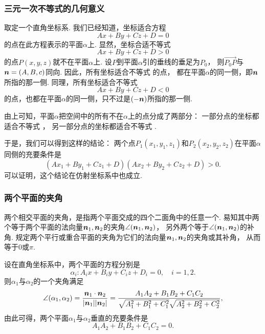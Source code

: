 \subsubsection{三元一次不等式的几何意义}
取定一个直角坐标系.
我们已经知道，坐标适合方程\[
	A x + B y + C z + D = 0
\]的点在此方程表示的平面\(\alpha\)上.
显然，坐标合适不等式
\begin{equation}\label{equation:解析几何.平面的侧1}
	A x + B y + C z + D > 0
\end{equation}
的点\(P(x,y,z)\)就不在平面\(\alpha\)上.
设\(P\)到平面\(\alpha\)引的垂线的垂足为\(P_0\)，
则\(\vec{P_0 P}\)与\(\boldsymbol{n}=(A,B,c)\)同向.
因此，所有坐标适合不等式  的点，
都在平面\(\alpha\)的同一侧，即\(\boldsymbol{n}\)所指的那一侧.
同理，所有坐标适合不等式
\begin{equation}\label{equation:解析几何.平面的侧2}
	A x + B y + C z + D < 0
\end{equation}
的点，也都在平面\(\alpha\)的同一侧，只不过是\((-\boldsymbol{n})\)所指的那一侧.

由上可知，平面\(\alpha\)把空间中的所有不在\(\alpha\)上的点分成了两部分：
一部分点的坐标都适合不等式 ，
另一部分点的坐标都适合不等式 .

于是，我们可以得到这样的结论：
两个点\(P_1(x_1,y_1,z_1)\)和\(P_2(x_2,y_2,z_2)\)在平面\(\alpha\)同侧的充要条件是\[
	(A x_1 + B y_1 + C z_1 + D) (A x_2 + B y_2 + C z_2 + D) > 0.
\]
可以证明，这个结论在仿射坐标系中也成立.

\subsubsection{两个平面的夹角}
两个相交平面的夹角，是指两个平面交成的四个二面角中的任意一个.
易知其中两个等于两个平面的法向量\(\boldsymbol{n}_1,\boldsymbol{n}_2\)的夹角\(\angle(\boldsymbol{n}_1,\boldsymbol{n}_2)\)，
另外两个等于\(\angle(\boldsymbol{n}_1,\boldsymbol{n}_2)\)的补角.
规定两个平行或重合平面的夹角为它们的法向量\(\boldsymbol{n}_1,\boldsymbol{n}_2\)的夹角或其补角，
从而等于\(0\)或\(\pi\).

设在直角坐标系中，两个平面的方程分别是\[
	\alpha_i:
	A_i x + B_i y + C_i z + D_i = 0,
	\quad i=1,2.
\]
则\(\alpha_1\)与\(\alpha_2\)的一个夹角满足\[
	\angle(\alpha_1,\alpha_2)
	= \frac{\boldsymbol{n}_1 \cdot \boldsymbol{n}_2}{\abs{\boldsymbol{n}_1} \abs{\boldsymbol{n}_2}}
	= \frac{A_1 A_2 + B_1 B_2 + C_1 C_2}{\sqrt{A_1^2 + B_1^2 + C_1^2} \sqrt{A_2^2 + B_2^2 + C_2^2}},
\]
由此可得，两个平面\(\alpha_1\)与\(\alpha_2\)垂直的充要条件是
\begin{equation}
	A_1 A_2 + B_1 B_2 + C_1 C_2 = 0.
\end{equation}

